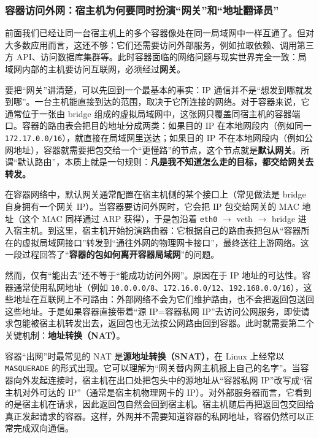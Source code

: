 \subsubsection{容器访问外网：宿主机为何要同时扮演“网关”和“地址翻译员”}

前面我们已经让同一台宿主机上的多个容器像处在同一局域网中一样互通了。但对大多数应用而言，这还不够：它们还需要访问外部服务，例如拉取依赖、调用第三方 API、访问数据库集群等。此时容器面临的网络问题与现实世界完全一致：局域网内部的主机要访问互联网，必须经过\textbf{网关}。

要把“网关”讲清楚，可以先回到一个最基本的事实：IP 通信并不是“想发到哪就发到哪”。一台主机能直接到达的范围，取决于它所连接的网络。对于容器来说，它通常位于一张由 bridge 组成的虚拟局域网中，这张网只覆盖同宿主机的容器端口。容器的路由表会把目的地址分成两类：如果目的 IP 在本地网段内（例如同一 \texttt{172.17.0.0/16}），就直接在局域网里送达；如果目的 IP 不在本地网段内（例如公网地址），容器就需要把包交给一个“更懂路”的节点，这个节点就是\textbf{默认网关}。所谓“默认路由”，本质上就是一句规则：\textbf{凡是我不知道怎么走的目标，都交给网关去转发。}

在容器网络中，默认网关通常配置在宿主机侧的某个接口上（常见做法是 bridge 自身拥有一个网关 IP）。当容器要访问外网时，它会把 IP 包交给网关的 MAC 地址（这个 MAC 同样通过 ARP 获得），于是包沿着 \texttt{eth0} $\rightarrow$ veth $\rightarrow$ bridge 进入宿主机。到这里，宿主机开始扮演路由器：它根据自己的路由表把包从“容器所在的虚拟局域网接口”转发到“通往外网的物理网卡接口”，最终送往上游网络。这一段过程回答了“\textbf{容器的包如何离开容器局域网}”的问题。

然而，仅有“能出去”还不等于“能成功访问外网”。原因在于 IP 地址的可达性。容器通常使用私网地址（例如 \texttt{10.0.0.0/8}、\texttt{172.16.0.0/12}、\texttt{192.168.0.0/16}），这些地址在互联网上不可路由：外部网络不会为它们维护路由，也不会把返回包送回这些地址。于是如果容器直接带着“源 IP=容器私网 IP”去访问公网服务，即使请求包能被宿主机转发出去，返回包也无法按公网路由回到容器。此时就需要第二个关键机制：\textbf{地址转换（NAT）}。

容器“出网”时最常见的 NAT 是\textbf{源地址转换（SNAT）}，在 Linux 上经常以 \texttt{MASQUERADE} 的形式出现。它可以理解为“网关替内网主机报上自己的名字”。当容器向外发起连接时，宿主机在出口处把包头中的源地址从“容器私网 IP”改写成“宿主机对外可达的 IP”（通常是宿主机物理网卡的 IP）。对外部服务器而言，它看到的是宿主机在请求，因此返回包自然会回到宿主机。宿主机随后再把返回包交回给真正发起请求的容器。这样，外网并不需要知道容器的私网地址，容器仍然可以正常完成双向通信。

